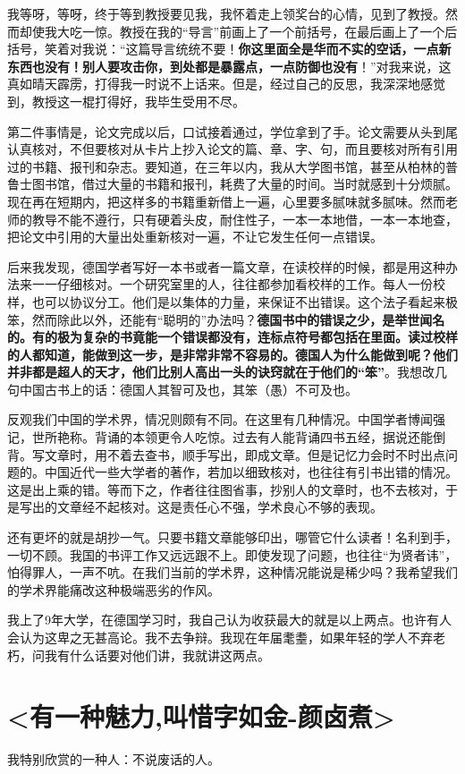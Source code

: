 \documentclass[UTF8,a4paper,8pt]{ctexart}
\begin{document}
 我等呀，等呀，终于等到教授要见我，我怀着走上领奖台的心情，见到了教授。然而却使我大吃一惊。教授在我的“导言”前画上了一个前括号，在最后画上了一个后括号，笑着对我说：“这篇导言统统不要！\textbf{你这里面全是华而不实的空话，一点新东西也没有！别人要攻击你，到处都是暴露点，一点防御也没有}！”对我来说，这真如晴天霹雳，打得我一时说不上话来。但是，经过自己的反思，我深深地感觉到，教授这一棍打得好，我毕生受用不尽。
 
 第二件事情是，论文完成以后，口试接着通过，学位拿到了手。论文需要从头到尾认真核对，不但要核对从卡片上抄入论文的篇、章、字、句，而且要核对所有引用过的书籍、报刊和杂志。要知道，在三年以内，我从大学图书馆，甚至从柏林的普鲁士图书馆，借过大量的书籍和报刊，耗费了大量的时间。当时就感到十分烦腻。现在再在短期内，把这样多的书籍重新借上一遍，心里要多腻味就多腻味。然而老师的教导不能不遵行，只有硬着头皮，耐住性子，一本一本地借，一本一本地查，把论文中引用的大量出处重新核对一遍，不让它发生任何一点错误。
 
 后来我发现，德国学者写好一本书或者一篇文章，在读校样的时候，都是用这种办法来一一仔细核对。一个研究室里的人，往往都参加看校样的工作。每人一份校样，也可以协议分工。他们是以集体的力量，来保证不出错误。这个法子看起来极笨，然而除此以外，还能有“聪明的”办法吗？\textbf{德国书中的错误之少，是举世闻名的。有的极为复杂的书竟能一个错误都没有，连标点符号都包括在里面。读过校样的人都知道，能做到这一步，是非常非常不容易的。德国人为什么能做到呢？他们并非都是超人的天才，他们比别人高出一头的诀窍就在于他们的“笨”}。我想改几句中国古书上的话：德国人其智可及也，其笨（愚）不可及也。
 
 反观我们中国的学术界，情况则颇有不同。在这里有几种情况。中国学者博闻强记，世所艳称。背诵的本领更令人吃惊。过去有人能背诵四书五经，据说还能倒背。写文章时，用不着去查书，顺手写出，即成文章。但是记忆力会时不时出点问题的。中国近代一些大学者的著作，若加以细致核对，也往往有引书出错的情况。这是出上乘的错。等而下之，作者往往图省事，抄别人的文章时，也不去核对，于是写出的文章经不起核对。这是责任心不强，学术良心不够的表现。
 
 还有更坏的就是胡抄一气。只要书籍文章能够印出，哪管它什么读者！名利到手，一切不顾。我国的书评工作又远远跟不上。即使发现了问题，也往往“为贤者讳”，怕得罪人，一声不吭。在我们当前的学术界，这种情况能说是稀少吗？我希望我们的学术界能痛改这种极端恶劣的作风。
 
 我上了9年大学，在德国学习时，我自己认为收获最大的就是以上两点。也许有人会认为这卑之无甚高论。我不去争辩。我现在年届耄耋，如果年轻的学人不弃老朽，问我有什么话要对他们讲，我就讲这两点。
 
 \newpage
 \section{<有一种魅力,叫惜字如金-颜卤煮>}
 我特别欣赏的一种人：不说废话的人。
 
\end{document}
